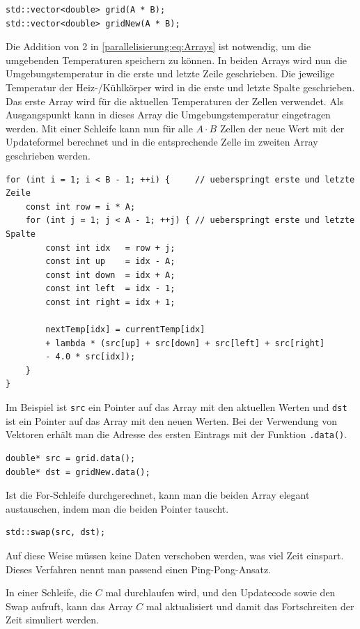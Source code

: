 \begin{lstlisting}
std::vector<double> grid(A * B);
std::vector<double> gridNew(A * B);
\end{lstlisting}
Die Addition von 2 in \eqref{parallelisierung:eq:Arrays} ist notwendig, um die umgebenden Temperaturen speichern zu können.
In beiden Arrays wird nun die Umgebungstemperatur in die erste und letzte Zeile geschrieben.
Die jeweilige Temperatur der Heiz-/Kühlkörper wird in die erste und letzte Spalte geschrieben.
Das erste Array wird für die aktuellen Temperaturen der Zellen verwendet.
Als Ausgangspunkt kann in dieses Array die Umgebungstemperatur eingetragen werden.
Mit einer Schleife kann nun für alle $A \cdot B$ Zellen der neue Wert mit der Updateformel berechnet und in die entsprechende Zelle im zweiten Array geschrieben werden.
\begin{lstlisting}[caption={Update-Schritt (seriell)},label={parallelisierung:code:updateSeriel}]
for (int i = 1; i < B - 1; ++i) {     // ueberspringt erste und letzte Zeile
	const int row = i * A;
	for (int j = 1; j < A - 1; ++j) { // ueberspringt erste und letzte Spalte
		const int idx   = row + j;
		const int up    = idx - A;
		const int down  = idx + A;
		const int left  = idx - 1;
		const int right = idx + 1;
		
		nextTemp[idx] = currentTemp[idx]
		+ lambda * (src[up] + src[down] + src[left] + src[right]
		- 4.0 * src[idx]);
	}
}
\end{lstlisting}
Im Beispiel ist \texttt{src} ein Pointer auf das Array mit den aktuellen Werten und \texttt{dst} ist ein Pointer auf das Array mit den neuen Werten.
Bei der Verwendung von Vektoren erhält man die Adresse des ersten Eintrags mit der Funktion \texttt{.data()}.
\begin{lstlisting}
double* src = grid.data();
double* dst = gridNew.data();
\end{lstlisting}

Ist die For-Schleife durchgerechnet, kann man die beiden Array elegant austauschen, indem man die beiden Pointer tauscht.
\begin{lstlisting}
std::swap(src, dst);
\end{lstlisting}
Auf diese Weise müssen keine Daten verschoben werden, was viel Zeit einspart.
Dieses Verfahren nennt man passend einen Ping-Pong-Ansatz.

In einer Schleife, die $C$ mal durchlaufen wird, und den Updatecode sowie den Swap aufruft, kann das Array $C$ mal aktualisiert und damit das Fortschreiten der Zeit simuliert werden.

